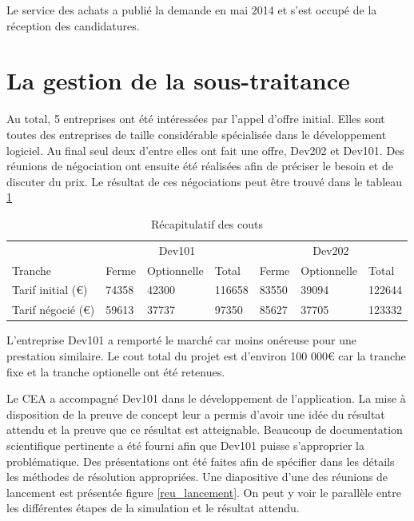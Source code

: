 Le service des achats a publié la demande en mai 2014 et s'est occupé de la réception des candidatures.

\section{La gestion de la sous-traitance}
 
 Au total, 5 entreprises ont été intéressées par l'appel d'offre initial. Elles sont toutes des entreprises de taille considérable spécialisée dans le développement logiciel. Au final seul deux d'entre elles ont fait une offre, Dev202 et Dev101. Des réunions de négociation ont ensuite été réalisées afin de préciser le besoin et de discuter du prix. Le résultat de ces négociations peut être trouvé dans le tableau \ref{ref_prix} 
 
\begin{table}[h]
\caption{Récapitulatif des couts}
\label{ref_prix}
\begin{tabular}{l|lll|lll}
              &  \multicolumn{3}{c}{Dev101}       & \multicolumn{3}{c}{Dev202}               \\
             Tranche &  Ferme &  Optionnelle & Total &  Ferme & Optionnelle & Total \\
              \hline
Tarif initial (€) & 74358        & 42300             & 116658   &      83550         &      39094 & 122644 \\
Tarif négocié (€) &         59613     &        37737            &   97350    &      85627         &        37705            &      123332
\end{tabular}
\end{table}

L'entreprise Dev101 a remporté le marché car moins onéreuse pour une prestation similaire. Le cout total du projet est d’environ 100 000€ car la tranche fixe et la tranche optionelle ont été retenues.

Le CEA a accompagné Dev101 dans le développement de l’application. La mise à disposition de la preuve de concept leur a permis d’avoir une idée du résultat attendu et la preuve que ce résultat est atteignable. Beaucoup de documentation scientifique pertinente a été fourni afin que Dev101 puisse s’approprier la problématique. Des présentations ont été faites afin de spécifier dans les détails les méthodes de résolution appropriées. Une diapositive d’une des réunions de lancement est présentée figure \ref{reu_lancement}. On peut y voir le parallèle entre les différentes étapes de la simulation et le résultat attendu.


